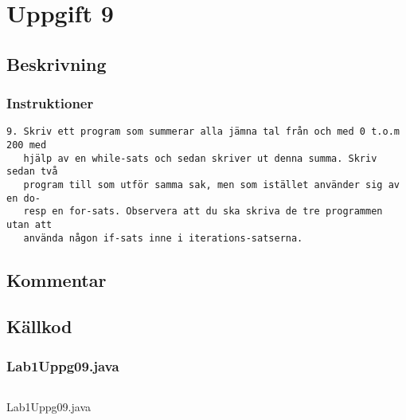 \section{Uppgift 9}\label{uppgift-9}

\subsection{Beskrivning}

\subsubsection*{Instruktioner}
\begin{verbatim}
9. Skriv ett program som summerar alla jämna tal från och med 0 t.o.m 200 med
   hjälp av en while-sats och sedan skriver ut denna summa. Skriv sedan två
   program till som utför samma sak, men som istället använder sig av en do-
   resp en for-sats. Observera att du ska skriva de tre programmen utan att
   använda någon if-sats inne i iterations-satserna.
\end{verbatim}

\subsection{Kommentar}

\subsection{Källkod}\label{uppgift-9_src}
\subsubsection*{Lab1Uppg09.java}
\begin{listing}[H]
    \inputminted[]{java}{src/Lab1Uppg09.java}
    \caption{Lab1Uppg09.java}
    \label{Uppg9src}
\end{listing}
